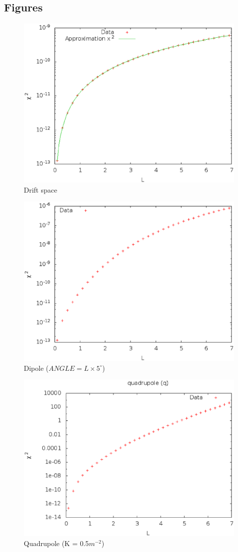 \documentclass[a4paper]{cernatsnote}
\begin{document}
\subsection{Figures}
\label{ap:fig}

\begin{figure}[!h]
  \centering
  \includegraphics[width=0.8\columnwidth]{imgs/dr.eps}
  \caption{Drift space}
\end{figure}

\begin{figure}
  \centering
  \includegraphics[width=0.8\columnwidth]{imgs/di.eps}
  \caption{Dipole ($ANGLE = L\times 5^{\circ}$)}
\end{figure}

\begin{figure}
  \centering
  \includegraphics[width=0.8\columnwidth]{imgs/q.eps}
  \caption{Quadrupole (K = 0.5$m^{-2}$)}
\end{figure}
\end{document}
